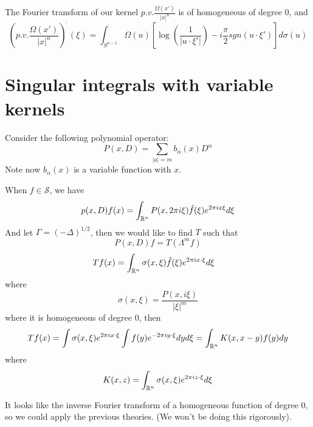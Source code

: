 \begin{theorem}
    The Fourier transform of our kernel $p.v.\frac{\Omega(x')}{|x|^n}$ is of homogeneous of degree 0, and
    \begin{equation*}
        \left(p.v.\frac{\Omega(x')}{|x|^n}\right)^{\widehat{\phantom{.}}}(\xi)=\int_{S^{n-1}}\Omega(u)\left[\log\left(\frac{1}{|u\cdot\xi'|}\right)-i\frac{\pi}{2}sgn(u\cdot\xi')\right]d\sigma(u)
    \end{equation*}
\end{theorem}



\section{Singular integrals with variable kernels}
Consider the following polynomial operator:
\begin{equation*}
    P(x,D)=\sum_{|a|=m}b_\alpha(x) D^\alpha
\end{equation*}
Note now $b_\alpha(x)$ is a variable function with $x$.

When $f\in\mathcal{S}$, we have
\begin{equation*}
    p(x,D)f(x)=\int_{\mathbb{R}^n}P(x,2\pi i\xi)\hat{f}(\xi)e^{2\pi ix\xi}d\xi
\end{equation*}
And let $\Gamma=(-\Delta)^{1/2}$, then we would like to find $T$ such that
\begin{equation*}
    P(x,D)f=T(\Lambda^mf)
\end{equation*}
\begin{align*}
    Tf(x)&=\int_{\mathbb{R}^n}\sigma(x,\xi)\hat{f}(\xi)e^{2\pi ix\cdot\xi}d\xi
\end{align*}
where
\begin{equation*}
    \sigma(x,\xi)=\frac{P(x,i\xi)}{|\xi|^m}
\end{equation*}
where it is homogeneous of degree 0, then 
\begin{equation*}
    Tf(x)=\int\sigma(x,\xi)e^{2\pi ix\cdot\xi}\int f(y)e^{-2\pi iy\cdot\xi}dyd\xi=\int_{\mathbb{R}^n}K(x,x-y)f(y)dy
\end{equation*}
where
\begin{equation*}
    K(x,z)=\int_{\mathbb{R}^n}\sigma(x,\xi)e^{2\pi iz\cdot\xi}d\xi
\end{equation*}
\begin{note}
    It looks like the inverse Fourier transform of a homogeneous function of degree 0, so we could apply the previous theories. (We won't be doing this rigorously).
\end{note}
